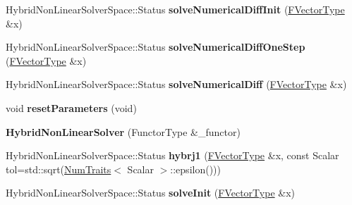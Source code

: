 \begin{DoxyCompactItemize}
\mbox{\label{class_eigen_1_1_hybrid_non_linear_solver_a03e013471915c4395578affbd2e29e26}} 
Hybrid\+Non\+Linear\+Solver\+Space\+::\+Status {\bfseries solve\+Numerical\+Diff\+Init} (\hyperlink{group___core___module}{F\+Vector\+Type} \&x)
\item 
\mbox{\label{class_eigen_1_1_hybrid_non_linear_solver_a73ce76462a048e23cdfcd18c18bd187b}} 
Hybrid\+Non\+Linear\+Solver\+Space\+::\+Status {\bfseries solve\+Numerical\+Diff\+One\+Step} (\hyperlink{group___core___module}{F\+Vector\+Type} \&x)
\item 
\mbox{\label{class_eigen_1_1_hybrid_non_linear_solver_a019c209d3c67020247583dce00a5e760}} 
Hybrid\+Non\+Linear\+Solver\+Space\+::\+Status {\bfseries solve\+Numerical\+Diff} (\hyperlink{group___core___module}{F\+Vector\+Type} \&x)
\item 
\mbox{\label{class_eigen_1_1_hybrid_non_linear_solver_a08b1a535646ff113b502b495594782bc}} 
void {\bfseries reset\+Parameters} (void)
\item 
\mbox{\label{class_eigen_1_1_hybrid_non_linear_solver_aaf90e23a6bad869ca1a9cadf62af0dd4}} 
{\bfseries Hybrid\+Non\+Linear\+Solver} (Functor\+Type \&\+\_\+functor)
\item 
\mbox{\label{class_eigen_1_1_hybrid_non_linear_solver_a1b5eddcc7f215e790b740ad94f0e4389}} 
Hybrid\+Non\+Linear\+Solver\+Space\+::\+Status {\bfseries hybrj1} (\hyperlink{group___core___module}{F\+Vector\+Type} \&x, const Scalar tol=std\+::sqrt(\hyperlink{group___core___module_struct_eigen_1_1_num_traits}{Num\+Traits}$<$ Scalar $>$\+::epsilon()))
\item 
\mbox{\label{class_eigen_1_1_hybrid_non_linear_solver_a197044e0f63c1077846a0279e47e934f}} 
Hybrid\+Non\+Linear\+Solver\+Space\+::\+Status {\bfseries solve\+Init} (\hyperlink{group___core___module}{F\+Vector\+Type} \&x)
\item 
\mbox{\label{class_eigen_1_1_hybrid_non_linear_solver_a64c9d49fa4645ad58a45dedcb1491252}} 

\end{DoxyCompactItemize}
